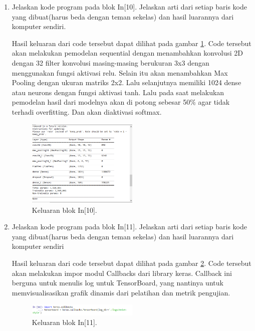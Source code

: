 \begin{enumerate}
\item Jelaskan kode program pada blok In[10]. Jelaskan arti dari setiap baris kode yang dibuat(harus beda dengan teman sekelas) dan hasil luarannya dari komputer sendiri. \par

Hasil keluaran dari code tersebut dapat dilihat pada gambar \ref{math10}. Code tersebut akan melakukan pemodelan sequential dengan menambahkan konvolusi 2D dengan 32 filter konvolusi masing-masing berukuran 3x3 dengan menggunakan fungsi aktivasi relu. Selain itu akan menambahkan Max Pooling dengan ukuran matriks 2x2. Lalu selanjutnya memiliki 1024 dense atau neurons dengan fungsi aktivasi tanh. Lalu pada saat melakukan pemodelan hasil dari modelnya akan di potong sebesar 50\% agar tidak terhadi overfitting. Dan akan diaktivasi softmax.
		\begin{figure}[!htbp]
		\centerline{\includegraphics[width=0.5\textwidth]{figures/im/math10.png}}
		\caption{Keluaran blok In[10].}
		\label{math10}
		\end{figure}

\item Jelaskan kode program pada blok In[11]. Jelaskan arti dari setiap baris kode yang dibuat(harus beda dengan teman sekelas) dan hasil luarannya dari komputer sendiri \par

Hasil keluaran dari code tersebut dapat dilihat pada gambar \ref{math11}. Code tersebut akan melakukan impor modul Callbacks dari library keras. Callback ini berguna untuk menulis log untuk TensorBoard, yang nantinya untuk memvisualisasikan grafik dinamis dari pelatihan dan metrik pengujian.
		\begin{figure}[!htbp]
		\centerline{\includegraphics[width=0.5\textwidth]{figures/im/math11.png}}
		\caption{Keluaran blok In[11].}
		\label{math11}
		\end{figure}


\end{enumerate}
